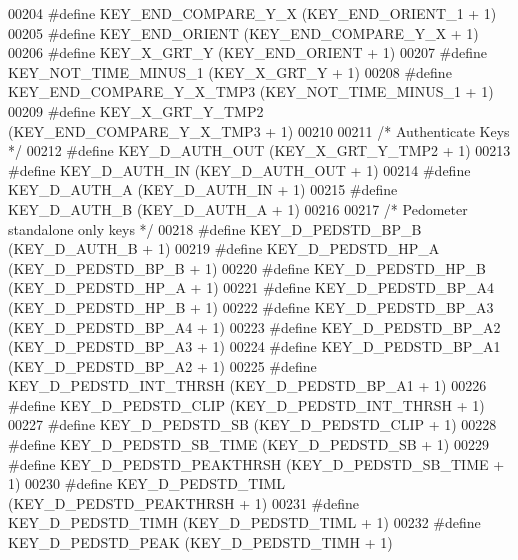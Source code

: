 \begin{DoxyCode}
00204 \textcolor{preprocessor}{#define KEY\_END\_COMPARE\_Y\_X         (KEY\_END\_ORIENT\_1 + 1) }
00205 \textcolor{preprocessor}{#define KEY\_END\_ORIENT              (KEY\_END\_COMPARE\_Y\_X + 1)}
00206 \textcolor{preprocessor}{#define KEY\_X\_GRT\_Y                 (KEY\_END\_ORIENT + 1)}
00207 \textcolor{preprocessor}{#define KEY\_NOT\_TIME\_MINUS\_1        (KEY\_X\_GRT\_Y + 1)       }
00208 \textcolor{preprocessor}{#define KEY\_END\_COMPARE\_Y\_X\_TMP3    (KEY\_NOT\_TIME\_MINUS\_1 + 1) }
00209 \textcolor{preprocessor}{#define KEY\_X\_GRT\_Y\_TMP2            (KEY\_END\_COMPARE\_Y\_X\_TMP3 + 1)}
00210 
00211 \textcolor{comment}{/* Authenticate Keys */}
00212 \textcolor{preprocessor}{#define KEY\_D\_AUTH\_OUT              (KEY\_X\_GRT\_Y\_TMP2 + 1)}
00213 \textcolor{preprocessor}{#define KEY\_D\_AUTH\_IN               (KEY\_D\_AUTH\_OUT + 1)}
00214 \textcolor{preprocessor}{#define KEY\_D\_AUTH\_A                (KEY\_D\_AUTH\_IN + 1)}
00215 \textcolor{preprocessor}{#define KEY\_D\_AUTH\_B                (KEY\_D\_AUTH\_A + 1)}
00216 
00217 \textcolor{comment}{/* Pedometer standalone only keys */}
00218 \textcolor{preprocessor}{#define KEY\_D\_PEDSTD\_BP\_B           (KEY\_D\_AUTH\_B + 1)}
00219 \textcolor{preprocessor}{#define KEY\_D\_PEDSTD\_HP\_A           (KEY\_D\_PEDSTD\_BP\_B + 1)}
00220 \textcolor{preprocessor}{#define KEY\_D\_PEDSTD\_HP\_B           (KEY\_D\_PEDSTD\_HP\_A + 1)}
00221 \textcolor{preprocessor}{#define KEY\_D\_PEDSTD\_BP\_A4          (KEY\_D\_PEDSTD\_HP\_B + 1)}
00222 \textcolor{preprocessor}{#define KEY\_D\_PEDSTD\_BP\_A3          (KEY\_D\_PEDSTD\_BP\_A4 + 1)}
00223 \textcolor{preprocessor}{#define KEY\_D\_PEDSTD\_BP\_A2          (KEY\_D\_PEDSTD\_BP\_A3 + 1)}
00224 \textcolor{preprocessor}{#define KEY\_D\_PEDSTD\_BP\_A1          (KEY\_D\_PEDSTD\_BP\_A2 + 1)}
00225 \textcolor{preprocessor}{#define KEY\_D\_PEDSTD\_INT\_THRSH      (KEY\_D\_PEDSTD\_BP\_A1 + 1)}
00226 \textcolor{preprocessor}{#define KEY\_D\_PEDSTD\_CLIP           (KEY\_D\_PEDSTD\_INT\_THRSH + 1)}
00227 \textcolor{preprocessor}{#define KEY\_D\_PEDSTD\_SB             (KEY\_D\_PEDSTD\_CLIP + 1)}
00228 \textcolor{preprocessor}{#define KEY\_D\_PEDSTD\_SB\_TIME        (KEY\_D\_PEDSTD\_SB + 1)}
00229 \textcolor{preprocessor}{#define KEY\_D\_PEDSTD\_PEAKTHRSH      (KEY\_D\_PEDSTD\_SB\_TIME + 1)}
00230 \textcolor{preprocessor}{#define KEY\_D\_PEDSTD\_TIML           (KEY\_D\_PEDSTD\_PEAKTHRSH + 1)}
00231 \textcolor{preprocessor}{#define KEY\_D\_PEDSTD\_TIMH           (KEY\_D\_PEDSTD\_TIML + 1)}
00232 \textcolor{preprocessor}{#define KEY\_D\_PEDSTD\_PEAK           (KEY\_D\_PEDSTD\_TIMH + 1)}

\end{DoxyCode}
